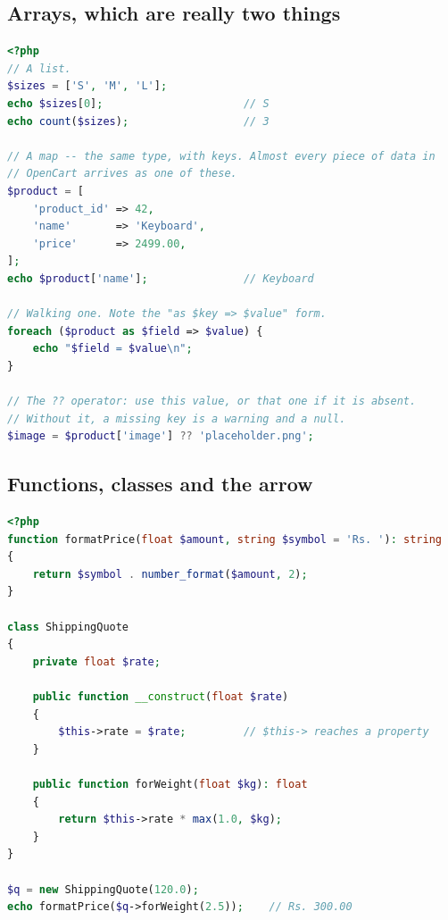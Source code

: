 \subsection{Arrays, which are really two things}

\begin{lstlisting}[language=php]
<?php
// A list.
$sizes = ['S', 'M', 'L'];
echo $sizes[0];                      // S
echo count($sizes);                  // 3

// A map -- the same type, with keys. Almost every piece of data in
// OpenCart arrives as one of these.
$product = [
    'product_id' => 42,
    'name'       => 'Keyboard',
    'price'      => 2499.00,
];
echo $product['name'];               // Keyboard

// Walking one. Note the "as $key => $value" form.
foreach ($product as $field => $value) {
    echo "$field = $value\n";
}

// The ?? operator: use this value, or that one if it is absent.
// Without it, a missing key is a warning and a null.
$image = $product['image'] ?? 'placeholder.png';
\end{lstlisting}

\subsection{Functions, classes and the arrow}

\begin{lstlisting}[language=php]
<?php
function formatPrice(float $amount, string $symbol = 'Rs. '): string
{
    return $symbol . number_format($amount, 2);
}

class ShippingQuote
{
    private float $rate;

    public function __construct(float $rate)
    {
        $this->rate = $rate;         // $this-> reaches a property
    }

    public function forWeight(float $kg): float
    {
        return $this->rate * max(1.0, $kg);
    }
}

$q = new ShippingQuote(120.0);
echo formatPrice($q->forWeight(2.5));    // Rs. 300.00
\end{lstlisting}

